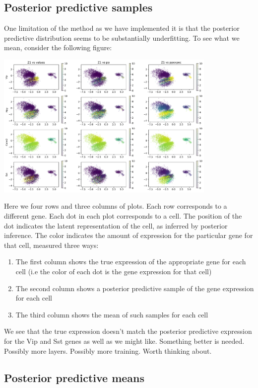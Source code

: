 \subsection{Posterior predictive samples}

One limitation of the method as we have implemented it is that the posterior predictive distribution seems to be substantially underfitting.  To see what we mean, consider the following figure:

\includegraphics[width=0.8\textwidth]{pics/Z1gn}

Here we four rows and three columns of plots.  Each row corresponds to a different gene.  Each dot in each plot corresponds to a cell.  The position of the dot indicates the latent representation of the cell, as inferred by posterior inference.  The color indicates the amount of expression for the particular gene for that cell, measured three ways:

\begin{enumerate}
\item The first column shows the true expression of the appropriate gene for each cell (i.e the color of each dot is the gene expression for that cell)
\item The second column shows a posterior predictive sample of the gene expression for each cell
\item The third column shows the mean of such samples for each cell
\end{enumerate}

We see that the true expression doesn't match the posterior predictive expression for the Vip and Sst genes as well as we might like.  Something better is needed.  Possibly more layers.  Possibly more training.  Worth thinking about.

\subsection{Posterior predictive means}

